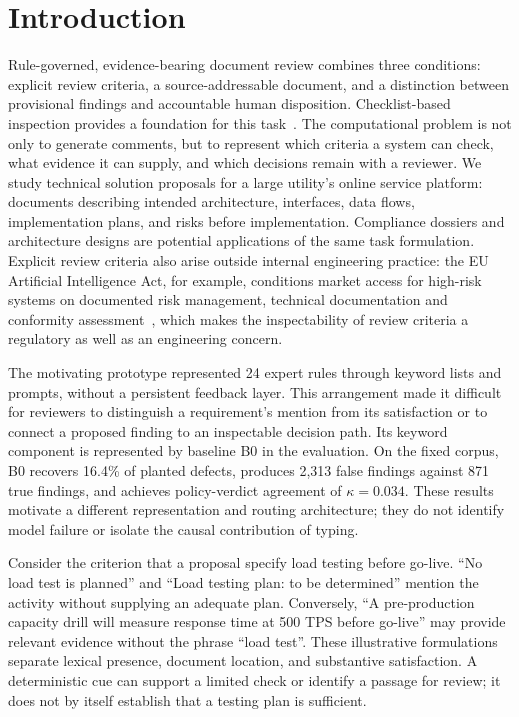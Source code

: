 \documentclass[computers,article,submit,moreauthors]{Definitions/mdpi}
\begin{document}
\section{Introduction}

Rule-governed, evidence-bearing document review combines three conditions: explicit review criteria, a source-addressable document, and a distinction between provisional findings and accountable human disposition. Checklist-based inspection provides a foundation for this task~\cite{fagan1976,lait2000}. The computational problem is not only to generate comments, but to represent which criteria a system can check, what evidence it can supply, and which decisions remain with a reviewer. We study technical solution proposals for a large utility's online service platform: documents describing intended architecture, interfaces, data flows, implementation plans, and risks before implementation. Compliance dossiers and architecture designs are potential applications of the same task formulation. Explicit review criteria also arise outside internal engineering practice: the EU Artificial Intelligence Act, for example, conditions market access for high-risk systems on documented risk management, technical documentation and conformity assessment~\cite{aiact2024}, which makes the inspectability of review criteria a regulatory as well as an engineering concern.

The motivating prototype represented 24 expert rules through keyword lists and prompts, without a persistent feedback layer. This arrangement made it difficult for reviewers to distinguish a requirement's mention from its satisfaction or to connect a proposed finding to an inspectable decision path. Its keyword component is represented by baseline B0 in the evaluation. On the fixed corpus, B0 recovers 16.4\% of planted defects, produces 2,313 false findings against 871 true findings, and achieves policy-verdict agreement of $\kappa=0.034$. These results motivate a different representation and routing architecture; they do not identify model failure or isolate the causal contribution of typing.

Consider the criterion that a proposal specify load testing before go-live. ``No load test is planned'' and ``Load testing plan: to be determined'' mention the activity without supplying an adequate plan. Conversely, ``A pre-production capacity drill will measure response time at 500 TPS before go-live'' may provide relevant evidence without the phrase ``load test''. These illustrative formulations separate lexical presence, document location, and substantive satisfaction. A deterministic cue can support a limited check or identify a passage for review; it does not by itself establish that a testing plan is sufficient.
\end{document}
